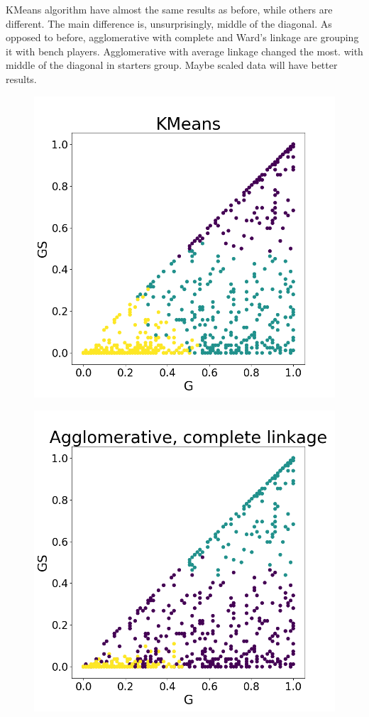 \documentclass[a4paper]{article}
\begin{document}
KMeans algorithm have almost the same results as before, while others are different. The main difference is, unsurprisingly, middle of the diagonal. As opposed to before, agglomerative with complete and Ward's linkage are grouping it with bench players. Agglomerative with average linkage changed the most. with middle of the diagonal in starters group. Maybe scaled data will have better results.

\begin{figure}
\centering
\begin{minipage}{.22\textwidth}
  \centering
  \includegraphics[scale=0.14]{kmeans_g_gs_mp_scaled.png}
  \label{fig:kmeans_g_gs_mp_scaled}
\end{minipage}
\begin{minipage}{.22\textwidth}
  \centering
  \includegraphics[scale=0.14]{complete_link_g_gs_mp_scaled.png}

\end{minipage}
\end{figure}
\end{document}
